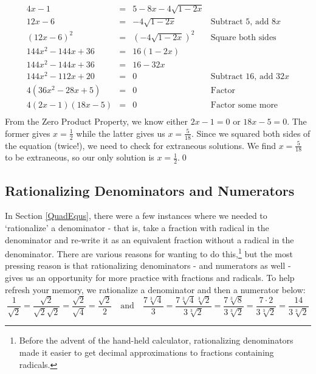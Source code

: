 \documentclass[10pt]{article}
\begin{document}
\begin{ex}
\begin{enumerate}
\[\begin{array}{rclr}
4x - 1 & = & 5 - 8x - 4\sqrt{1-2x} &  \\ [2pt]

12x - 6 & = & -4\sqrt{1-2x} & \text{Subtract $5$, add $8x$}\\ [2pt]

(12x-6)^2 & = & (-4\sqrt{1-2x})^2 & \text{Square both sides} \\[2pt]

144x^2 - 144x + 36 & = & 16(1-2x) & \\ [2pt]

144x^2 -  144x + 36 & = & 16 - 32x & \\[2pt]

144x^2 - 112x + 20 & = & 0 & \text{Subtract $16$, add $32x$} \\[2pt]

4(36x^2 - 28x + 5) & = & 0 & \text{Factor} \\[2pt]

4(2x-1)(18x - 5) & = & 0 & \text{Factor some more} \\

\end{array} \] From the Zero Product Property, we know either $2x-1 = 0$ or $18x - 5 = 0$.  The former gives $x = \frac{1}{2}$ while the latter gives us $x = \frac{5}{18}$.  Since we squared both sides of the equation (twice!), we need to check for extraneous solutions.  We find $x = \frac{5}{18}$ to be extraneous, so our only solution is $x = \frac{1}{2}$.\qed




\end{enumerate}

\end{ex}

\subsection{Rationalizing Denominators and Numerators}

In Section \ref{QuadEqus}, there were a few instances where we needed to `rationalize' a denominator - that is, take a fraction with radical in the denominator and re-write it as an equivalent fraction without a radical in the denominator.  There are various reasons for wanting to do this,\footnote{Before the advent of the hand-held calculator, rationalizing denominators made it easier to get decimal approximations to fractions containing radicals.} but the most pressing reason is that rationalizing denominators - and numerators as well - gives us an opportunity for more practice with fractions and radicals. To help refresh your memory, we rationalize a denominator and then a numerator below: \[ \dfrac{1}{\sqrt{2}} = \dfrac{\sqrt{2}}{\sqrt{2} \sqrt{2}} = \dfrac{\sqrt{2}}{\sqrt{4}} = \dfrac{\sqrt{2}}{2} \quad \text{and} \quad \dfrac{7\sqrt[3]{4}}{3} = \dfrac{7 \sqrt[3]{4}\sqrt[3]{2}}{3\sqrt[3]{2}} = \dfrac{7\sqrt[3]{8}}{3\sqrt[3]{2}} = \dfrac{7 \cdot 2}{3\sqrt[3]{2}} =  \dfrac{14}{3\sqrt[3]{2}} \]
\end{document}
